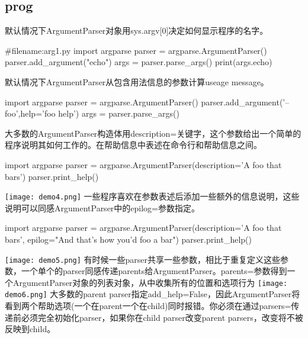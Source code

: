\subsection{prog}
默认情况下ArgumentParser对象用sys.argv[0]决定如何显示程序的名字。
\begin{python}
#filename:arg1.py
import argparse
parser = argparse.ArgumentParser()
parser.add_argument("echo")
args = parser.parse_args()
print(args.echo)
\end{python}
默认情况下ArgumentParser从包含用法信息的参数计算useage message。
\begin{python}
import argparse
parser = argparse.ArgumentParser()
parser.add_argument('--foo',help='foo help')
args = parser.parse_args()
\end{python}

\begin{figure}[htbp]
\centering
{}
\label{fig:1}
\end{figure}
大多数的ArgumentParser构造体用description=关键字，这个参数给出一个简单的程序说明其如何工作的。在帮助信息中表述在命令行和帮助信息之间。
\begin{python}
import argparse
parser = argparse.ArgumentParser(description='A foo that bars')
parser.print_help()
\end{python}
\texttt{[image: demo4.png]}\newline
一些程序喜欢在参数表述后添加一些额外的信息说明，这些说明可以同感ArgumentParser中的epilog=参数指定。
\begin{python}
import argparse
parser = argparse.ArgumentParser(description='A foo that bars',
epilog="And that's how you'd foo a bar")
parser.print_help()
\end{python}
\texttt{[image: demo5.png]}
有时候一些parser共享一些参数，相比于重复定义这些参数，一个单个的parser同感传递parents给ArgumentParser。parents=参数得到一个ArgumentParser对象的列表对象，从中收集所有的位置和选项行为\newline
\texttt{[image: demo6.png]}\newline
大多数的parent parser指定add\_help=False，因此ArgumentParser将看到两个帮助选项(一个在parent一个在child)同时报错。你必须在通过parsers=传递前必须完全初始化parser，如果你在child parser改变parent parsers，改变将不被反映到child。
